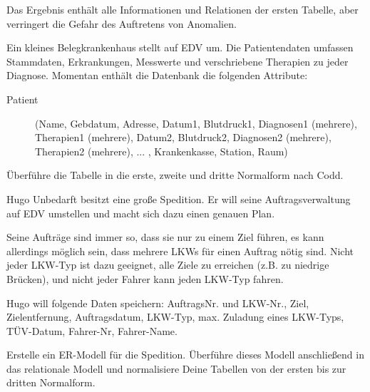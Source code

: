 \documentclass[9pt,a4paper]{arbeitsblatt}
\begin{document}
Das Ergebnis enthält alle Informationen und Relationen der ersten Tabelle, aber
verringert die Gefahr des Auftretens von Anomalien.

\clearpage
\ReiheTitel
\large

\begin{aufgabe}
	Ein kleines Belegkrankenhaus stellt auf EDV um. Die Patientendaten umfassen 
	Stammdaten, Erkrankungen, Messwerte und verschriebene Therapien zu jeder 
	Diagnose. Momentan enthält die Datenbank die folgenden Attribute:
	\begin{description}
		\item[Patient] (Name, Gebdatum, Adresse, Datum1, Blutdruck1,
			Diagnosen1 (mehrere), Therapien1 (mehrere), Datum2, Blutdruck2, Diagnosen2
			(mehrere), Therapien2 (mehrere), ... , Krankenkasse, Station, Raum)
	\end{description}

	Überführe die Tabelle in die erste, zweite und dritte Normalform nach
	Codd.
\end{aufgabe}

\begin{aufgabe}
	Hugo Unbedarft besitzt eine große Spedition. Er will seine Auftragsverwaltung
	auf EDV umstellen und macht sich dazu einen genauen Plan.

	Seine Aufträge sind immer so, dass sie nur zu einem Ziel führen, es kann
	allerdings möglich sein, dass mehrere LKWs für einen Auftrag nötig sind. Nicht
	jeder LKW-Typ ist dazu geeignet, alle Ziele zu erreichen (z.B. zu niedrige
	Brücken), und nicht jeder Fahrer kann jeden LKW-Typ fahren.

	Hugo will folgende Daten speichern: AuftragsNr. und LKW-Nr., Ziel,
	Zielentfernung, Auftragsdatum, LKW-Typ, max. Zuladung eines LKW-Typs,
	TÜV-Datum, Fahrer-Nr, Fahrer-Name.

	Erstelle ein ER-Modell für die Spedition. Überführe dieses Modell
	anschließend in das relationale Modell und normalisiere Deine Tabellen von
	der ersten bis zur dritten Normalform.
\end{aufgabe}
\end{document}

